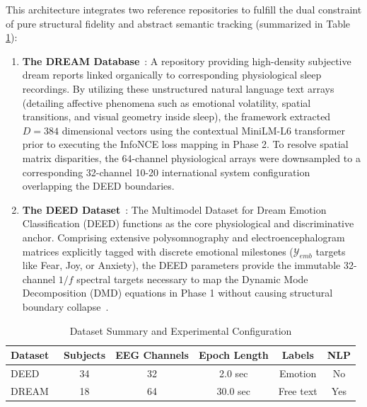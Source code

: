 \documentclass[journal]{IEEEtran}
\begin{document}
This architecture integrates two reference repositories to fulfill the dual constraint of pure structural fidelity and abstract semantic tracking (summarized in Table \ref{tab:dataset_summary}):
\begin{enumerate}
    \item \textbf{The DREAM Database}~\cite{wong2023dream}: A repository providing high-density subjective dream reports linked organically to corresponding physiological sleep recordings. By utilizing these unstructured natural language text arrays (detailing affective phenomena such as emotional volatility, spatial transitions, and visual geometry inside sleep), the framework extracted $D=384$ dimensional vectors using the contextual MiniLM-L6 transformer prior to executing the InfoNCE loss mapping in Phase 2. To resolve spatial matrix disparities, the 64-channel physiological arrays were downsampled to a corresponding 32-channel 10-20 international system configuration overlapping the DEED boundaries.
    \item \textbf{The DEED Dataset}~\cite{zheng2022deed}: The Multimodel Dataset for Dream Emotion Classification (DEED) functions as the core physiological and discriminative anchor. Comprising extensive polysomnography and electroencephalogram matrices explicitly tagged with discrete emotional milestones ($\mathcal{Y}_{emb}$ targets like Fear, Joy, or Anxiety), the DEED parameters provide the immutable 32-channel $1/f$ spectral targets necessary to map the Dynamic Mode Decomposition (DMD) equations in Phase 1 without causing structural boundary collapse~\cite{diezig2024eeg, hartmann2018eeggan}.
\end{enumerate}

\begin{table}[t]
\centering
\caption{Dataset Summary and Experimental Configuration}
\label{tab:dataset_summary}
\begin{tabular}{lccccc}
\toprule
\textbf{Dataset} & \textbf{Subjects} & \textbf{EEG Channels} & \textbf{Epoch Length} & \textbf{Labels} & \textbf{NLP} \\
\midrule
DEED~\cite{zheng2022deed} & 34 & 32 & 2.0 sec & Emotion & No \\
DREAM~\cite{wong2023dream} & 18 & 64 & 30.0 sec & Free text & Yes \\
\bottomrule
\end{tabular}
\end{table}
\end{document}
